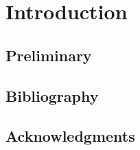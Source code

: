 \chapter{Introduction}
\label{chapter:Introduction}

\setcounter{page}{1}


\section{Preliminary}
\label{sec:Introduction_Preliminary}


\section{Bibliography}
\label{sec:Introduction_Bibliography}

\cite{Bouenard:MsC06, Gibet:GIMS06, Bouenard:COSTCONGAS07, Bouenard:SMPC07, Bouenard:ENACTIVE08, Bouenard:NIME08, Bouenard:CASA09, Bouenard:CIRMMT09, Bouenard:GW09, Bouenard:HAL09, Bouenard:ICMC09, Bouenard:PhD09, Bouenard:AAA10, Grond:DAFX10, Bouenard:CMJ11, Bouenard:VC12}


\section{Acknowledgments}
\label{sec:Introduction_Acknowledgments}
